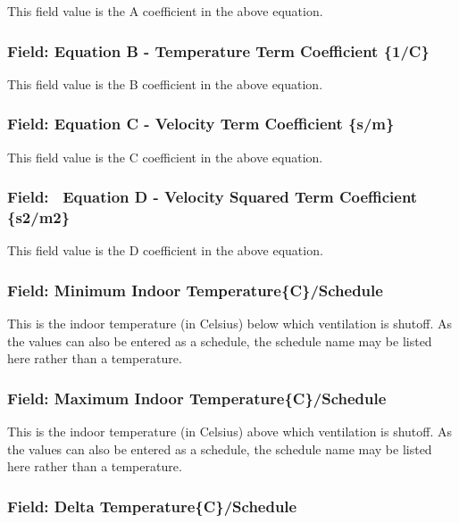 This field value is the A coefficient in the above equation.

\subsubsection{Field: Equation B - Temperature Term Coefficient \{1/C\}}\label{field-equation-b---temperature-term-coefficient-1c-1}

This field value is the B coefficient in the above equation.

\subsubsection{Field: Equation C - Velocity Term Coefficient \{s/m\}}\label{field-equation-c---velocity-term-coefficient-sm-1}

This field value is the C coefficient in the above equation.

\subsubsection{Field:~ Equation D - Velocity Squared Term Coefficient \{s2/m2\}}\label{field-equation-d---velocity-squared-term-coefficient-s2m2-1}

This field value is the D coefficient in the above equation.

\subsubsection{Field: Minimum Indoor Temperature\{C\}/Schedule}\label{field-minimum-indoor-temperaturecschedule}

This is the indoor temperature (in Celsius) below which ventilation is shutoff. As the values can also be entered as a schedule, the schedule name may be listed here rather than a temperature.

\subsubsection{Field: Maximum Indoor Temperature\{C\}/Schedule}\label{field-maximum-indoor-temperaturecschedule}

This is the indoor temperature (in Celsius) above which ventilation is shutoff. As the values can also be entered as a schedule, the schedule name may be listed here rather than a temperature.

\subsubsection{Field: Delta Temperature\{C\}/Schedule}\label{field-delta-temperaturecschedule}


